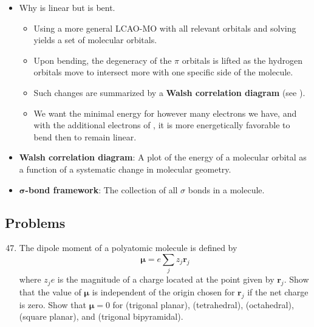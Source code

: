 \documentclass[../notes.tex]{subfiles}
\begin{document}
\begin{itemize}
\begin{itemize}
    \end{itemize}
    \item Why  is linear but  is bent.
    \begin{itemize}
        \item Using a more general LCAO-MO with all relevant orbitals and solving yields a set of molecular orbitals.
        \item Upon bending, the degeneracy of the $\pi$ orbitals is lifted as the hydrogen orbitals move to intersect more with one specific side of the molecule.
        \item Such changes are summarized by a \textbf{Walsh correlation diagram} (see \textcite[65]{bib:IChemNotes}).
        \item We want the minimal energy for however many electrons we have, and with the additional electrons of , it is more energetically favorable to bend then to remain linear.
    \end{itemize}
    \item \textbf{Walsh correlation diagram}: A plot of the energy of a molecular orbital as a function of a systematic change in molecular geometry.
    \item \textbf{$\bm{\sigma}$-bond framework}: The collection of all $\sigma$ bonds in a molecule.
\end{itemize}


\subsection*{Problems}
\begin{enumerate}[label={\textbf{10-\arabic*.}},ref={10-\arabic*}]
    \setcounter{enumi}{46}
    \item \label{prb:10-47}The dipole moment of a polyatomic molecule is defined by
    \begin{equation*}
        \bm{\mu} = e\sum_jz_j\mathbf{r}_j
    \end{equation*}
    where $z_je$ is the magnitude of a charge located at the point given by $\mathbf{r}_j$. Show that the value of $\bm{\mu}$ is independent of the origin chosen for $\mathbf{r}_j$ if the net charge is zero. Show that $\mathbf{\mu}=0$ for  (trigonal planar),  (tetrahedral),  (octahedral),  (square planar), and  (trigonal bipyramidal).
\end{enumerate}
\end{document}
